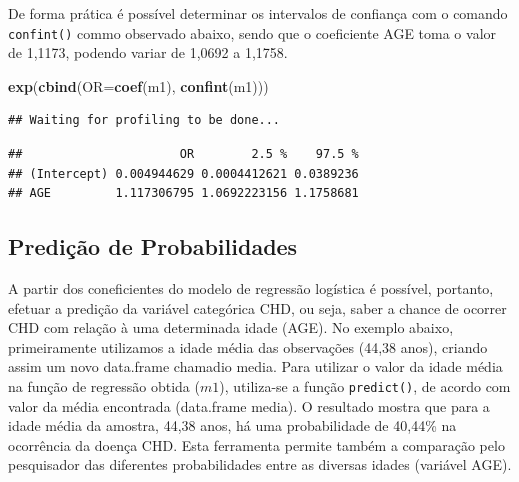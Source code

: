 \documentclass[12pt,brazil,]{book}
\newenvironment{Shaded}{\begin{snugshade}}{\end{snugshade}}
\newcommand{\DataTypeTok}[1]{\textcolor[rgb]{0.13,0.29,0.53}{#1}}
\newcommand{\KeywordTok}[1]{\textcolor[rgb]{0.13,0.29,0.53}{\textbf{#1}}}
\newcommand{\NormalTok}[1]{#1}
\newcommand{\OperatorTok}[1]{\textcolor[rgb]{0.81,0.36,0.00}{\textbf{#1}}}
\newcommand{\StringTok}[1]{\textcolor[rgb]{0.31,0.60,0.02}{#1}}
\begin{document}
De forma prática é possível determinar os intervalos de confiança com o
comando \texttt{confint()} commo observado abaixo, sendo que o
coeficiente AGE toma o valor de 1,1173, podendo variar de 1,0692 a
1,1758.

\begin{Shaded}
\begin{Highlighting}[]
\KeywordTok{exp}\NormalTok{(}\KeywordTok{cbind}\NormalTok{(}\DataTypeTok{OR=}\KeywordTok{coef}\NormalTok{(m1), }\KeywordTok{confint}\NormalTok{(m1)))}
\end{Highlighting}
\end{Shaded}

\begin{verbatim}
## Waiting for profiling to be done...
\end{verbatim}

\begin{verbatim}
##                      OR        2.5 %    97.5 %
## (Intercept) 0.004944629 0.0004412621 0.0389236
## AGE         1.117306795 1.0692223156 1.1758681
\end{verbatim}

\hypertarget{predicao-de-probabilidades}{%
\subsection{Predição de
Probabilidades}\label{predicao-de-probabilidades}}

A partir dos coneficientes do modelo de regressão logística é possível,
portanto, efetuar a predição da variável categórica CHD, ou seja, saber
a chance de ocorrer CHD com relação à uma determinada idade (AGE). No
exemplo abaixo, primeiramente utilizamos a idade média das observações
(44,38 anos), criando assim um novo data.frame chamadio media. Para
utilizar o valor da idade média na função de regressão obtida (\(m1\)),
utiliza-se a função \texttt{predict()}, de acordo com valor da média
encontrada (data.frame media). O resultado mostra que para a idade média
da amostra, 44,38 anos, há uma probabilidade de 40,44\% na ocorrência da
doença CHD. Esta ferramenta permite também a comparação pelo pesquisador
das diferentes probabilidades entre as diversas idades (variável AGE).

\begin{Shaded}
\end{Shaded}
\end{document}
